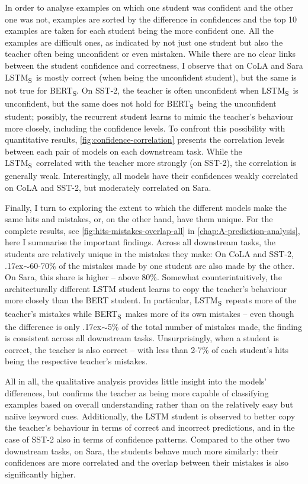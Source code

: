 \documentclass[bsc,frontabs,singlespacing,parskip,deptreport]{infthesis}
\def\mytilde{{\raise.17ex\hbox{$\scriptstyle\sim$}}}
\def\BERTS{BERT\textsubscript{S}}
\def\LSTMS{LSTM\textsubscript{S}}
\begin{document}
{{{      In order to analyse examples on which one student was confident and the other one was not, examples are sorted by the difference in confidences and the top 10 examples are taken for each student being the more confident one.
      All the examples are difficult ones, as indicated by not just one student but also the teacher often being unconfident or even mistaken.
      While there are no clear links between the student confidence and correctness, I observe that on CoLA and Sara \LSTMS~is mostly correct (when being the unconfident student), but the same is not true for \BERTS.
      On SST-2, the teacher is often unconfident when \LSTMS~is unconfident, but the same does not hold for \BERTS~being the unconfident student; possibly, the recurrent student learns to mimic the teacher's behaviour more closely, including the confidence levels.
      To confront this possibility with quantitative results, \autoref{fig:confidence-correlation} presents the correlation levels between each pair of models on each downstream task. While the \LSTMS~correlated with the teacher more strongly (on SST-2), the correlation is generally weak. Interestingly, all models have their confidences weakly correlated on CoLA and SST-2, but moderately correlated on Sara.

      Finally, I turn to exploring the extent to which the different models make the same hits and mistakes, or, on the other hand, have them unique.
      For the complete results, see \autoref{fig:hits-mistakes-overlap-all} in \autoref{chap:A-prediction-analysis}, here I summarise the important findings. 
      Across all downstream tasks, the students are relatively unique in the mistakes they make: On CoLA and SST-2, \mytilde60-70\% of the mistakes made by one student are also made by the other. On Sara, this share is higher -- above 80\%.
      Somewhat counterintuitively, the architecturally different LSTM student learns to copy the teacher's behaviour more closely than the BERT student.
      In particular, \LSTMS~repeats more of the teacher's mistakes while \BERTS~makes more of its own mistakes -- even though the difference is only \mytilde5\% of the total number of mistakes made, the finding is consistent across all downstream tasks. Unsurprisingly, when a student is correct, the teacher is also correct -- with less than 2-7\% of each student's hits being the respective teacher's mistakes.

      All in all, the qualitative analysis provides little insight into the models' differences, but confirms the teacher as being more capable of classifying examples based on overall understanding rather than on the relatively easy but naiive keyword cues.
      Additionally, the LSTM student is observed to better copy the teacher's behaviour in terms of correct and incorrect predictions, and in the case of SST-2 also in terms of confidence patterns. 
      Compared to the other two downstream tasks, on Sara, the students behave much more similarly: their confidences are more correlated and the overlap between their mistakes is also significantly higher.
    }
    
}}
\end{document}
